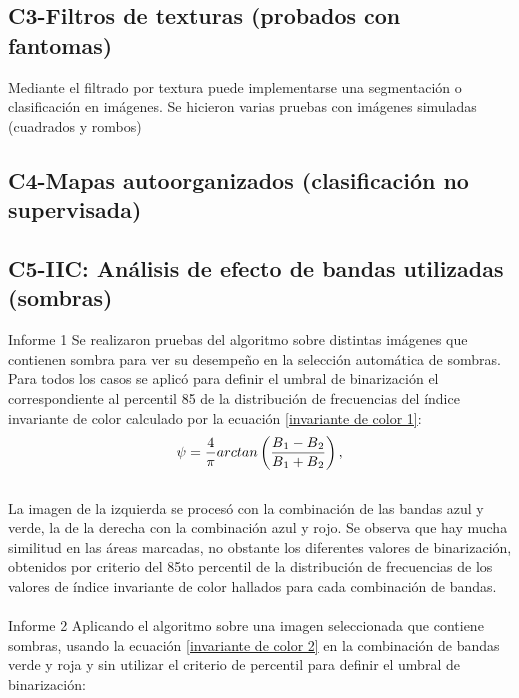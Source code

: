 \color{orange} %
\subsection{C3-Filtros de texturas (probados con fantomas)}
Mediante el filtrado por textura puede implementarse una segmentación o clasificación en imágenes. Se hicieron varias pruebas con imágenes simuladas (cuadrados y rombos)
\subsection{C4-Mapas autoorganizados (clasificación no supervisada)}
\subsection{C5-IIC: Análisis de efecto de bandas utilizadas (sombras)}
Informe 1
Se realizaron pruebas del algoritmo sobre distintas imágenes que contienen sombra para ver su desempeño en la selección automática de sombras. Para todos los casos se aplicó para definir el umbral de binarización el correspondiente al percentil 85 de la distribución de frecuencias del índice invariante de color calculado por la ecuación \ref{invariante de color 1}:
\\
\begin{equation}
	\psi=\frac{4}{\pi} arctan\left(\frac{B\textsubscript{1}-B\textsubscript{2}}{B\textsubscript{1}+B\textsubscript{2}}\right),\label{invariante de color 1}
\end{equation}
\\
La imagen de la izquierda se procesó con la combinación de las bandas azul y verde, la de la derecha con la combinación azul y rojo.
Se observa que hay mucha similitud en las áreas marcadas, no obstante los diferentes valores de binarización, obtenidos por criterio del 85to percentil de la distribución de frecuencias de los valores de índice invariante de color hallados para cada combinación de bandas.
\\
\\
Informe 2
Aplicando el algoritmo sobre una imagen seleccionada que contiene sombras, usando la ecuación \ref{invariante de color 2} en la combinación de bandas verde y roja y sin utilizar el criterio de percentil para definir el umbral de binarización:
